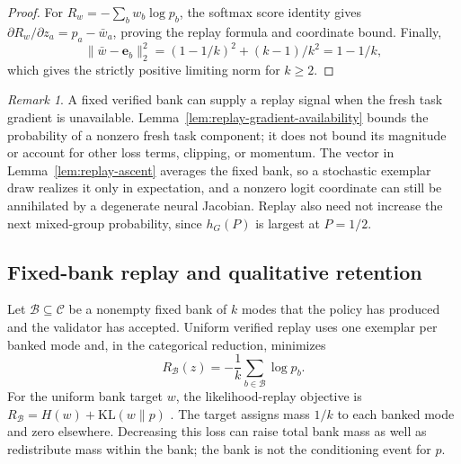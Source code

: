 \documentclass{article}
\newcommand{\enforcehalffinalproseline}{%
  \setlength{\parfillskip}{0pt plus .20\linewidth}}
\newcommand{\1}{\mathbf 1}
\theoremstyle{remark}
\newtheorem{remark}[lemma]{Remark}
\theoremstyle{definition}
\theoremstyle{plain}
\begin{document}
\begin{proof}
\enforcehalffinalproseline
For $R_w=-\sum_b w_b\log p_b$, the softmax score identity gives
$\partial R_w/\partial z_a=p_a-\bar w_a$, proving the replay formula and
coordinate bound. Finally,
\[
 \|\bar w-\mathbf e_b\|_2^2=(1-1/k)^2+(k-1)/k^2=1-1/k,
\]
which gives the strictly positive limiting norm for $k\ge2$.
\end{proof}

\begin{remark}
A fixed verified bank can supply a replay signal when the fresh task
gradient is unavailable. Lemma~\ref{lem:replay-gradient-availability}
bounds the probability of a nonzero fresh task component; it does not bound
its magnitude or account for other loss terms, clipping, or momentum. The vector in
Lemma~\ref{lem:replay-ascent} averages the fixed bank, so a stochastic
exemplar draw realizes it only in expectation, and a nonzero logit coordinate
can still be annihilated by a degenerate neural Jacobian. Replay also need not
increase the next mixed-group probability, since $h_G(P)$ is largest at
$P=1/2$.
\end{remark}

\subsection{Fixed-bank replay and qualitative retention}
\label{app:theory-replay}

Let $\mathcal B\subseteq\mathcal C$ be a nonempty fixed bank of $k$ modes that
the policy has produced and the validator has accepted. Uniform verified replay
uses one exemplar per banked mode and, in the categorical reduction, minimizes
\begin{equation}
  R_{\mathcal B}(z)
  =-\frac1k\sum_{b\in\mathcal B}\log p_b.
  \label{eq:verified-replay-loss}
\end{equation}
For the uniform bank target $w$, the likelihood-replay objective is
$R_{\mathcal B}=H(w)+\mathrm{KL}(w\|p)$
\citep[App.~D.1, version~4]{li2025divergence}. The target assigns mass
$1/k$ to each banked mode and zero elsewhere. Decreasing this loss can raise
total bank mass as well as redistribute mass within the bank; the bank is
not the conditioning event for $p$.
\end{document}
